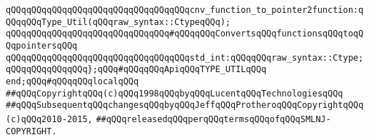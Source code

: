 \newline
\verb|qQQqqQQqqQQqqQQqqQQqqQQqqQQqqQQqqQQqcnv_function_to_pointer2function:qQQqqQQqType_Util(qQQqraw_syntax::CtypeqQQq);|\newline
\verb|qQQqqQQqqQQqqQQqqQQqqQQqqQQqqQQq#qQQqqQQqConvertsqQQqfunctionsqQQqtoqQQqpointersqQQq|\newline
\newline
\verb|qQQqqQQqqQQqqQQqqQQqqQQqqQQqqQQqqQQqstd_int:qQQqqQQqraw_syntax::Ctype;|\newline
\newline
\verb|qQQqqQQqqQQqqQQq};qQQq#qQQqqQQqApiqQQqTYPE_UTILqQQq|\newline
\newline
\verb|end;qQQq#qQQqqQQqlocalqQQq|\newline
\newline
\newline
\verb|##qQQqCopyrightqQQq(c)qQQq1998qQQqbyqQQqLucentqQQqTechnologiesqQQq|\newline
\verb|##qQQqSubsequentqQQqchangesqQQqbyqQQqJeffqQQqProtheroqQQqCopyrightqQQq(c)qQQq2010-2015,|\newline
\verb|##qQQqreleasedqQQqperqQQqtermsqQQqofqQQqSMLNJ-COPYRIGHT.|\newline


